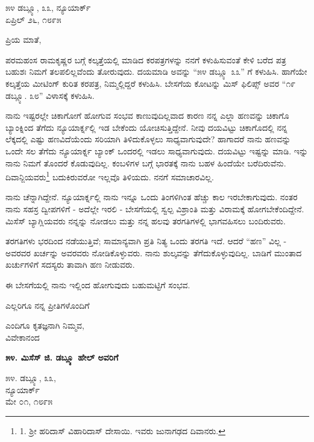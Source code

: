 \begin{flushright}
೫೪ ಡಬ್ಲ್ಯೂ, ೩೩, ನ್ಯೂಯಾರ್ಕ್\\ಏಪ್ರಿಲ್ ೨೬, ೧೮೯೫
\end{flushright}

ಪ್ರಿಯ ಮಾತೆ,

ಪರಮಹಂಸ ರಾಮಕೃಷ್ಣರ ಬಗ್ಗೆ ಕಲ್ಕತ್ತೆಯಲ್ಲಿ ಮಾಡಿದ ಕರಪತ್ರಗಳನ್ನು ನನಗೆ ಕಳುಹಿಸುವಂತೆ ಕೇಳಿ ಬರೆದ ಪತ್ರ ಬಹುಶಃ ನಿಮಗೆ ತಲಪಲಿಲ್ಲವೆಂದು ತೋರುವುದು. ದಯಮಾಡಿ ಅವನ್ನು “೫೪ ಡಬ್ಲ್ಯೂ ೩೩” ಗೆ ಕಳುಹಿಸಿ. ಹಾಗೆಯೇ ಕಲ್ಕತ್ತೆಯ ಮೀಟಿಂಗ್ ಕುರಿತ ಕರಪತ್ರ, ನಿಮ್ಮಲ್ಲಿದ್ದರೆ ಕಳುಹಿಸಿ. ಬೇಸಗೆಯ ಕೋಟನ್ನು ಮಿಸ್ ಫಿಲಿಪ್ಸ್ ಅವರ “೧೯ ಡಬ್ಲ್ಯೂ. ೩೮” ವಿಳಾಸಕ್ಕೆ ಕಳುಹಿಸಿ.

ನಾನು ಇಷ್ಟರಲ್ಲೇ ಚಿಕಾಗೋಗೆ ಹೋಗುವ ಸಂಭವ ಕಾಣುವುದಿಲ್ಲವಾದ ಕಾರಣ ನನ್ನ ಎಲ್ಲಾ ಹಣವನ್ನು ಚಿಕಾಗೊ ಬ್ಯಾಂಕ್ನಿಂದ ತೆಗೆದು ನ್ಯೂಯಾರ್ಕ್ನಲ್ಲಿ ಇಡ ಬೇಕೆಂದು ಯೋಚಿಸುತ್ತಿದ್ದೇನೆ. ನೀವು ದಯವಿಟ್ಟು ಚಿಕಾಗೊದಲ್ಲಿ ನನ್ನ ಲೆಕ್ಕದಲ್ಲಿ ಎಷ್ಟು ಹಣವಿದೆಯೆಂದು ಸರಿಯಾಗಿ ತಿಳಿದುಕೊಳ್ಳಲು ಸಾಧ್ಯವಾಗುವುದೇ? ಹಾಗಾದರೆ ನಾನು ಹಣವನ್ನು ಒಂದೇ ಸಲ ತೆಗೆದು ನ್ಯೂಯಾರ್ಕ್ನ ಬ್ಯಾಂಕ್ ಒಂದರಲ್ಲಿ ಇಡಲು ಸಾಧ್ಯವಾಗುವುದು. ದಯವಿಟ್ಟು ಇಷ್ಟನ್ನು ಮಾಡಿ. ಇನ್ನು ನಾನು ನಿಮಗೆ ತೊಂದರೆ ಕೊಡುವುದಿಲ್ಲ. ಕಂಬಳಿಗಳ ಬಗ್ಗೆ ಭಾರತಕ್ಕೆ ನಾನು ಬಹಳ ಹಿಂದೆಯೇ ಬರೆದಿರುವೆನು. ದಿವಾನ್ಜಿಯವರು\footnote{1. ಶ‍್ರೀ ಹರಿದಾಸ್ ವಿಹಾರಿದಾಸ್ ದೇಸಾಯಿ. ಇವರು ಜುನಾಗಢದ ದಿವಾನರು.} ಬದುಕಿರುವರೋ ಇಲ್ಲವೊ ತಿಳಿಯದು. ನನಗೆ ಸಮಾಚಾರವಿಲ್ಲ.

ನಾನು ಚೆನ್ನಾಗಿದ್ದೇನೆ. ನ್ಯೂಯಾರ್ಕ್ನಲ್ಲಿ ನಾನು ಇನ್ನೂ ಒಂದು ತಿಂಗಳಿಗಿಂತ ಹೆಚ್ಚು ಕಾಲ ಇರಬೇಕಾಗುವುದು. ನಂತರ ನಾನು ಸಹಸ್ರ ದ್ವೀಪಗಳಿಗೆ - ಅದೆಲ್ಲೇ ಇರಲಿ - ಬೇಸಗೆಯಲ್ಲಿ ಸ್ವಲ್ಪ ವಿಶ್ರಾಂತಿ ಮತ್ತು ವಿರಾಮಕ್ಕೆ ಹೋಗಬೇಕೆಂದಿದ್ದೇನೆ. ಮಿಸೆಸ್ ಬ್ಯಾಗ್ಲಿಯವರು ನನ್ನನ್ನು ನೋಡಲು ಮತ್ತು ನನ್ನ ಹಲವು ತರಗತಿಗಳಲ್ಲಿ ಭಾಗವಹಿಸಲು ಬಂದಿರುವರು.

ತರಗತಿಗಳು ಭರದಿಂದ ನಡೆಯುತ್ತಿವೆ; ಸಾಮಾನ್ಯವಾಗಿ ಪ್ರತಿ ನಿತ್ಯ ಒಂದು ತರಗತಿ ಇದೆ. ಆದರೆ “ಹಣ” ವಿಲ್ಲ - ಅವರವರ ಖರ್ಚನ್ನು ಅವರವರು ನೋಡಿಕೊಳ್ಳುವರು. ನಾನು ಶುಲ್ಕವನ್ನು ತೆಗೆದುಕೊಳ್ಳುವುದಿಲ್ಲ. ಬಾಡಿಗೆ ಮುಂತಾದ ಖರ್ಚುಗಳಿಗೆ ಸದಸ್ಯರು ತಾವಾಗಿ ಹಣ ನೀಡುವರು.

ಈ ಬೇಸಗೆಯಲ್ಲಿ ನಾನು ಇಲ್ಲಿಂದ ಹೋಗುವುದು ಬಹುಮಟ್ಟಿಗೆ ಸಂಭವ.

ಎಲ್ಲರಿಗೂ ನನ್ನ ಪ್ರೀತಿಗಳೊಂದಿಗೆ

\begin{flushright}
ಎಂದಿಗೂ ಕೃತಜ್ಞನಾಗಿ ನಿಮ್ಮವ,\\ವಿವೇಕಾನಂದ
\end{flushright}

\begin{center}
\textbf{೫೪. ಮಿಸೆಸ್ ಜಿ. ಡಬ್ಲ್ಯೂ ಹೇಲ್ ಅವರಿಗೆ}
\end{center}

\begin{flushright}
೫೪. ಡಬ್ಲ್ಯೂ, ೩೩,\\ನ್ಯೂಯಾರ್ಕ್\\ಮೇ ೦೧, ೧೮೯೫
\end{flushright}

